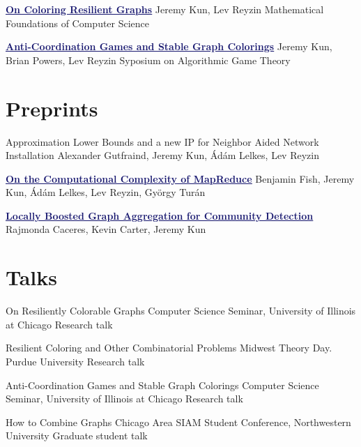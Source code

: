 \documentclass[11pt]{moderncv}
\begin{document}
         {\href{http://arxiv.org/abs/1402.4376}{\textcolor{MidnightBlue}{\underline{\textbf{On Coloring Resilient Graphs}}}}}
      {Jeremy Kun, Lev Reyzin}
      {Mathematical Foundations of Computer Science}
      {}
      {}

         {\href{http://arxiv.org/abs/1308.3258}{\textcolor{MidnightBlue}{\underline{\textbf{Anti-Coordination Games and Stable Graph Colorings}}}}}
      {Jeremy Kun, Brian Powers, Lev Reyzin}
      {Syposium on Algorithmic Game Theory}
      {}
      {}


   \section{Preprints}
         \cventry{}
         {Approximation Lower Bounds and a new IP for Neighbor Aided Network Installation}
      {}
      {Alexander Gutfraind, Jeremy Kun, Ádám Lelkes, Lev Reyzin}
      {}
      {}

      \cventry{}
         {\href{http://arxiv.org/abs/1410.0245}{\textcolor{MidnightBlue}{\underline{\textbf{On the Computational Complexity of MapReduce}}}}}
      {}
      {Benjamin Fish, Jeremy Kun, Ádám Lelkes, Lev Reyzin, György Turán}
      {}
      {}

      \cventry{}
         {\href{http://arxiv.org/abs/1405.3210}{\textcolor{MidnightBlue}{\underline{\textbf{Locally Boosted Graph Aggregation for Community Detection}}}}}
      {}
      {Rajmonda Caceres, Kevin Carter, Jeremy Kun}
      {}
      {}


   \section{Talks}
         {On Resiliently Colorable Graphs}
      {Computer Science Seminar, University of Illinois at Chicago}
      {Research talk}
      {}
      {}

         {Resilient Coloring and Other Combinatorial Problems}
      {Midwest Theory Day. Purdue University}
      {Research talk}
      {}
      {}

         {Anti-Coordination Games and Stable Graph Colorings}
      {Computer Science Seminar, University of Illinois at Chicago}
      {Research talk}
      {}
      {}

         {How to Combine Graphs}
      {Chicago Area SIAM Student Conference, Northwestern University}
      {Graduate student talk}
      {}
      {}
\end{document}
